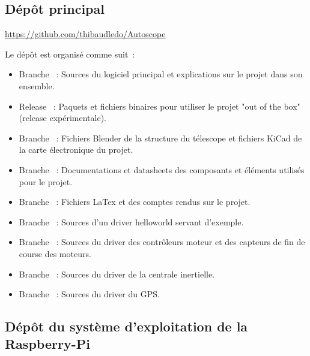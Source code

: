 \subsection{Dépôt principal}

\url{https://github.com/thibaudledo/Autoscope}

\vspace{1cm}

Le dépôt est organisé comme suit~:
\begin{itemize}[label=$\bullet$]
	\item Branche {\href{https://github.com/thibaudledo/Autoscope/tree/master}{}}~: Sources du logiciel principal et explications sur le projet dans son ensemble.
	\item Release {\href{https://github.com/thibaudledo/Autoscope/releases}{}}~: Paquets et fichiers binaires pour utiliser le projet "out of the box" (release expérimentale).
	\item Branche {\href{https://github.com/thibaudledo/Autoscope/tree/hardware}{}}~: Fichiers Blender de la structure du télescope et fichiers KiCad de la carte électronique du projet.
	\item Branche {\href{https://github.com/thibaudledo/Autoscope/tree/doc}{}}~: Documentations et datasheets des composants et éléments utilisés pour le projet.
	\item Branche {\href{https://github.com/thibaudledo/Autoscope/tree/latex}{}}~: Fichiers LaTex et  des comptes rendus sur le projet.
	\item Branche {\href{https://github.com/thibaudledo/Autoscope/tree/hello_mod}{}}~: Sources d'un driver helloworld servant d'exemple.
	\item Branche {\href{https://github.com/thibaudledo/Autoscope/tree/a4988_mod}{}}~: Sources du driver des contrôleurs moteur et des capteurs de fin de course des moteurs.
	\item Branche {\href{https://github.com/thibaudledo/Autoscope/tree/mpu_9250_mod}{}}~: Sources du driver de la centrale inertielle.
	\item Branche {\href{https://github.com/thibaudledo/Autoscope/tree/mtk3339d}{}}~: Sources du driver du GPS.
	\end{itemize}

\newpage
\subsection{Dépôt du système d'exploitation de la Raspberry-Pi}

